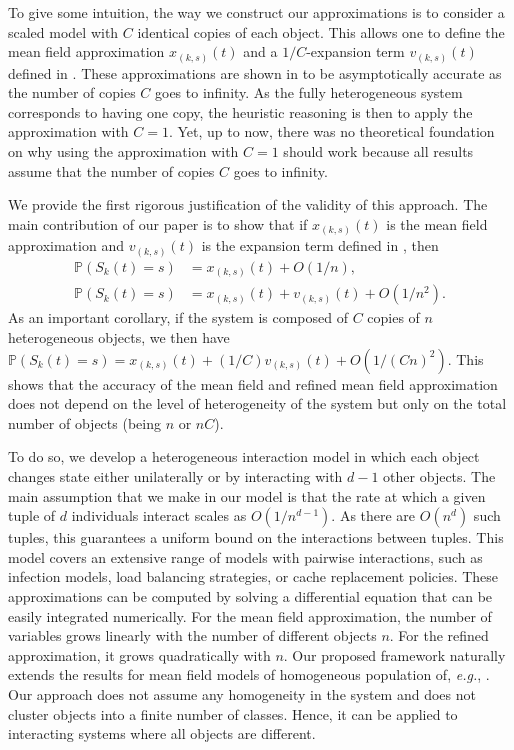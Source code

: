 \documentclass[acmsmall]{acmart}
\newcommand\Proba[1]{\mathbb{P}\left(#1\right)} %
\begin{document}
To give some intuition, the way we construct our approximations is to consider a scaled model with $C$ identical copies of each object. This allows one to define the mean field approximation $x_{(k,s)}(t)$ and a $1/C$-expansion term $v_{(k,s)}(t)$ defined in \cite{gastSizeExpansionsMean2019}. These approximations are shown in \cite{gastSizeExpansionsMean2019} to be asymptotically accurate as the number of copies $C$ goes to infinity. As the fully heterogeneous system corresponds to having one copy, the heuristic reasoning is then to apply the approximation with $C=1$. Yet, up to now, there was no theoretical foundation on why using the approximation with $C=1$ should work because all results assume that the number of copies $C$ goes to infinity.

We provide the first rigorous justification of the validity of this approach. The main contribution of our paper is to show that if $x_{(k,s)}(t)$ is the mean field approximation and $v_{(k,s)}(t)$ is the expansion term defined in \cite{gastSizeExpansionsMean2019}, then
\begin{align*}
  \Proba{S_k(t)=s} &= x_{(k,s)}(t) + O(1/n),\\
  \Proba{S_k(t)=s} &= x_{(k,s)}(t) + v_{(k,s)}(t) + O(1/n^2).
\end{align*}
{\color{myorange}As an important corollary, if the system is composed of $C$ copies of $n$ heterogeneous objects, we then have $\Proba{S_k(t)=s} = x_{(k,s)}(t) + (1/C) v_{(k,s)}(t) + O(1/(Cn)^2)$. This shows that the accuracy of the mean field and refined mean field approximation does not depend on the level of heterogeneity of the system but only on the total number of objects (being $n$ or $nC$).}

To do so, we develop a {\color{myorange} heterogeneous interaction model in which each object changes state either unilaterally or by interacting with $d-1$ other objects. The main assumption that we make in our model is that the rate at which a given tuple of $d$ individuals interact scales as $O(1/n^{d-1})$. As there are $O(n^d)$ such tuples, this guarantees a uniform bound on the interactions between tuples.} This model covers an extensive range of models with pairwise interactions, such as infection models, load balancing strategies, or cache replacement policies. These approximations can be computed by solving a differential equation that can be easily integrated numerically. For the mean field approximation, the number of variables grows linearly with the number of different objects $n$. For the refined approximation, it grows quadratically with $n$. Our proposed framework naturally extends the results for mean field models of homogeneous population of, \emph{e.g.}, \cite{gast2017expected,kurtzStrongApproximationTheorems1978,ying2016rate}. Our approach does not assume any homogeneity in the system and does not cluster objects into a finite number of classes. Hence, it can be applied to interacting systems where all objects are different.
\end{document}

